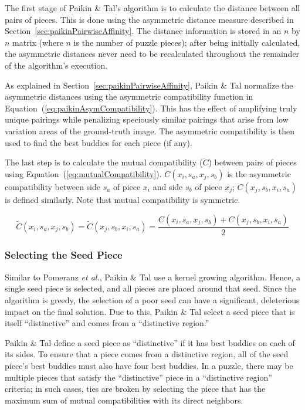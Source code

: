 \documentclass{report}
\def\eref#1{(\ref{#1})}
\begin{document}
The first stage of Paikin \& Tal's algorithm is to calculate the distance between all pairs of pieces.  This is done using the asymmetric distance measure described in Section~\ref{sec:paikinPairwiseAffinity}.  The distance information is stored in an $n$ by $n$ matrix (where $n$ is the number of puzzle pieces); after being initially calculated, the asymmetric distances never need to be recalculated throughout the remainder of the algorithm's execution.

As explained in Section~\ref{sec:paikinPairwiseAffinity}, Paikin \& Tal normalize the asymmetric distances using the asymmetric compatibility function in Equation~\eref{eq:paikinAsymCompatibility}.  This has the effect of amplifying truly unique pairings while penalizing speciously similar pairings that arise from low variation areas of the ground-truth image.  The asymmetric compatibility is then used to find the best buddies for each piece (if any).  

The last step is to calculate the mutual compatibility ($\tilde{C}$) between pairs of pieces using Equation~\eref{eq:mutualCompatibility}.  $C(x_i,s_a,x_j,s_b)$ is the asymmetric compatibility between side $s_a$ of piece $x_i$ and side $s_b$ of piece $x_j$; $C(x_j,s_b,x_i,s_a)$ is defined similarly.  Note that mutual compatibility is symmetric.

\begin{equation} \label{eq:mutualCompatibility}
\tilde{C}(x_i,s_a,x_j,s_b)=\tilde{C}(x_j,s_b,x_i,s_a)=\frac{C(x_i,s_a,x_j,s_b) + C(x_j,s_b,x_i,s_a) }{2}
\end{equation}

\subsubsection{Selecting the Seed Piece}\label{sec:paikinTalSeedPiece}

Similar to Pomeranz \textit{et al.}, Paikin \& Tal use a kernel growing algorithm.  Hence, a single seed piece is selected, and all pieces are placed around that seed.    Since the algorithm is greedy, the selection of a poor seed can have a significant, deleterious impact on the final solution.  Due to this, Paikin \& Tal select a seed piece that is itself ``distinctive'' and comes from a ``distinctive region.''  

Paikin \& Tal define a seed piece as ``distinctive'' if it has best buddies on each of its sides.  To ensure that a piece comes from a distinctive region, all of the seed piece's best buddies must also have four best buddies. In a puzzle, there may be multiple pieces that satisfy the ``distinctive'' piece in a ``distinctive region'' criteria; in such cases, ties are broken by selecting the piece that has the maximum sum of mutual compatibilities with its direct neighbors.
\end{document}
